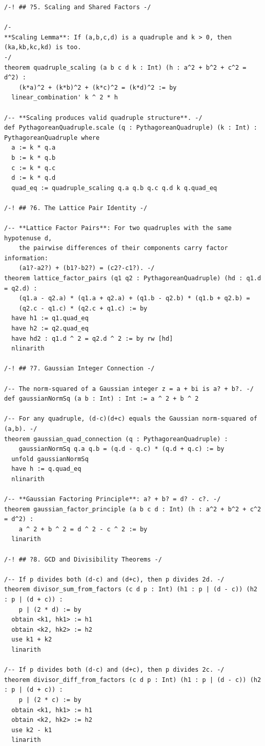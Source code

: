 \documentclass[11pt,twoside,openright]{book}
\theoremstyle{definition}
\theoremstyle{remark}
\begin{document}
\begin{lstlisting}[style=lean]
/-! ## ?5. Scaling and Shared Factors -/

/-
**Scaling Lemma**: If (a,b,c,d) is a quadruple and k > 0, then (ka,kb,kc,kd) is too.
-/
theorem quadruple_scaling (a b c d k : Int) (h : a^2 + b^2 + c^2 = d^2) :
    (k*a)^2 + (k*b)^2 + (k*c)^2 = (k*d)^2 := by
  linear_combination' k ^ 2 * h

/-- **Scaling produces valid quadruple structure**. -/
def PythagoreanQuadruple.scale (q : PythagoreanQuadruple) (k : Int) : PythagoreanQuadruple where
  a := k * q.a
  b := k * q.b
  c := k * q.c
  d := k * q.d
  quad_eq := quadruple_scaling q.a q.b q.c q.d k q.quad_eq

/-! ## ?6. The Lattice Pair Identity -/

/-- **Lattice Factor Pairs**: For two quadruples with the same hypotenuse d,
    the pairwise differences of their components carry factor information:
    (a1?-a2?) + (b1?-b2?) = (c2?-c1?). -/
theorem lattice_factor_pairs (q1 q2 : PythagoreanQuadruple) (hd : q1.d = q2.d) :
    (q1.a - q2.a) * (q1.a + q2.a) + (q1.b - q2.b) * (q1.b + q2.b) =
    (q2.c - q1.c) * (q2.c + q1.c) := by
  have h1 := q1.quad_eq
  have h2 := q2.quad_eq
  have hd2 : q1.d ^ 2 = q2.d ^ 2 := by rw [hd]
  nlinarith

/-! ## ?7. Gaussian Integer Connection -/

/-- The norm-squared of a Gaussian integer z = a + bi is a? + b?. -/
def gaussianNormSq (a b : Int) : Int := a ^ 2 + b ^ 2

/-- For any quadruple, (d-c)(d+c) equals the Gaussian norm-squared of (a,b). -/
theorem gaussian_quad_connection (q : PythagoreanQuadruple) :
    gaussianNormSq q.a q.b = (q.d - q.c) * (q.d + q.c) := by
  unfold gaussianNormSq
  have h := q.quad_eq
  nlinarith

/-- **Gaussian Factoring Principle**: a? + b? = d? - c?. -/
theorem gaussian_factor_principle (a b c d : Int) (h : a^2 + b^2 + c^2 = d^2) :
    a ^ 2 + b ^ 2 = d ^ 2 - c ^ 2 := by
  linarith

/-! ## ?8. GCD and Divisibility Theorems -/

/-- If p divides both (d-c) and (d+c), then p divides 2d. -/
theorem divisor_sum_from_factors (c d p : Int) (h1 : p | (d - c)) (h2 : p | (d + c)) :
    p | (2 * d) := by
  obtain <k1, hk1> := h1
  obtain <k2, hk2> := h2
  use k1 + k2
  linarith

/-- If p divides both (d-c) and (d+c), then p divides 2c. -/
theorem divisor_diff_from_factors (c d p : Int) (h1 : p | (d - c)) (h2 : p | (d + c)) :
    p | (2 * c) := by
  obtain <k1, hk1> := h1
  obtain <k2, hk2> := h2
  use k2 - k1
  linarith


\end{lstlisting}
\end{document}
